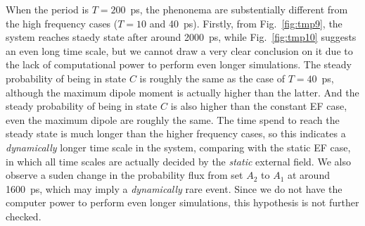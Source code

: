 \documentclass[aip,jcp,a4paper,preprint,onecolumn]{revtex4-1}
\begin{document}
When the period is $T=200$~ps, the phenonema are substentially different
from the high frequency cases ($T=10$ and 40~ps). Firstly, from Fig.~\ref{fig:tmp9}, the system reaches staedy state after around 2000~ps, while
Fig.~\ref{fig:tmp10} suggests an even long time scale, but we cannot draw
a very clear conclusion on it
due to the lack of computational power to perform even longer simulations. 
The steady probability of being in state $C$ is roughly the same as the
case of $T=40$~ps, although the maximum dipole moment is actually higher
than the latter. And the steady probability  of being in state $C$ is
also higher than the constant EF case, even the maximum dipole are roughly
the same. The time spend to reach the steady state is much longer than
the higher frequency cases, so this indicates a \emph{dynamically} longer time
scale in the system, comparing with the static EF case, in which all time scales
are actually decided by the \emph{static} external field. We also observe
a suden change in the probability flux from set $A_2$ to $A_1$ at
around 1600~ps, which may imply a \emph{dynamically} rare event.
Since we do not have the computer power to perform even longer simulations,
this hypothesis is not further checked.







\end{document}
